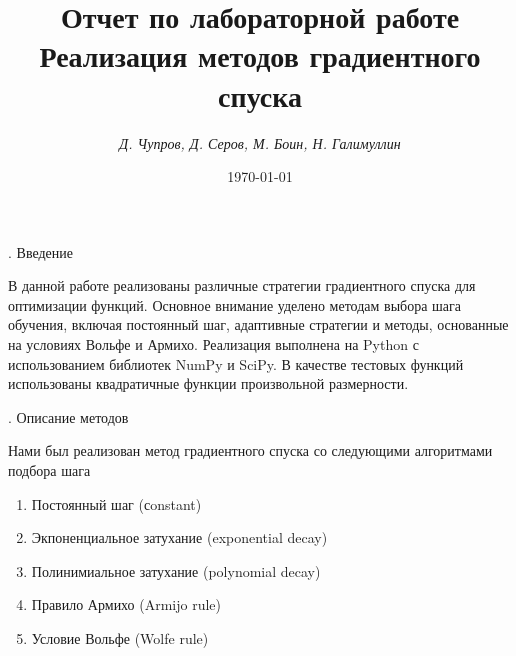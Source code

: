 \documentclass{article}
\title{Отчет по лабораторной работе \\ Реализация методов градиентного спуска}
\author{ \it Д. Чупров, Д. Серов, М. Боин, Н. Галимуллин }
\date{\today}
\begin{document}
\maketitle


\begin{center}
{ . Введение }
\end{center}

В данной работе реализованы различные стратегии градиентного спуска для оптимизации функций. Основное внимание уделено методам выбора шага обучения, включая постоянный шаг, адаптивные стратегии и методы, основанные на условиях Вольфе и Армихо. Реализация выполнена на Python с использованием библиотек NumPy и SciPy. В качестве тестовых функций использованы квадратичные функции произвольной размерности.


\begin{center}
{ . Описание методов }
\end{center}


Нами был реализован метод градиентного спуска со следующими алгоритмами подбора шага



\begin{enumerate}
    \item Постоянный шаг (сonstant)

    \item Экпоненциальное затухание (exponential decay)

    \item Полинимиальное затухание (polynomial decay)

    \item Правило Армихо (Armijo rule)

    \item Условие Вольфе (Wolfe rule)
\end{enumerate}
\end{document}
